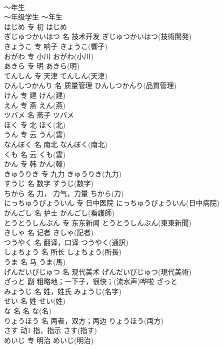 \documentclass[8pt]{extreport}
\begin{document}
\begin{CJK}{UTF8}{min}
\\	～年生	
\\	～年级学生	～年生	
\\	はじめ	专	初	はじめ	
\\	ぎじゅつかいはつ	名	技术开发	ぎじゅつかいはつ(技術開発)	
\\	きょうこ	专	响子	きょうこ(響子)	
\\	おがわ	专	小川	おがわ(小川)	
\\	あきら	专	明	あきら(明)	
\\	てんしん	专	天津	てんしん(天津)	
\\	ひんしつかんり	名	质量管理	ひんしつかんり(品質管理)	
\\	けん	专	建	けん(建)	
\\	えん	专	燕	えん(燕)	
\\	ツバメ	名	燕子	ツバメ	
\\	ほく	专	北	ほく(北)	
\\	うん	专	云	うん(雲)	
\\	なんぼく	名	南北	なんぼく(南北)	
\\	くも	名	云	くも(雲)	
\\	かん	专	韩	かん(韓)	
\\	きゅうりき	专	九力	きゅうりき(九力)	
\\	すうじ	名	数字	すうじ(数字)	
\\	ちから	名	力， 力气，力量	ちから(力)	
\\	にっちゅうびょういん	专	日中医院	にっちゅうびょういん(日中病院)	
\\	かんごし	名	护士	かんごし(看護師)	
\\	とうとうしんぶん	专	东东新闻	とうとうしんぶん(東東新聞)	
\\	きしゃ	名	记者	きしゃ(記者)	
\\	つうやく	名	翻译，口译	つうやく(通訳)	
\\	しょちょう	名	所长	しょちょう(所長)	
\\	うま	名	马	うま(馬)	
\\	げんだいびじゅつ	名	现代美术	げんだいびじゅつ(現代美術)	
\\	ざっと	副	粗略地；一下子，很快；(流水声)哗啦	ざっと	
\\	みょうじ	名	姓，姓氏	みょうじ(名字)	
\\	せい	名	姓	せい(姓)	
\\	な	名	名	な(名)	
\\	りょうほう	名	两者，双方；两边	りょうほう(両方)	
\\	さす	动1	指，指示	さす(指す)	
\\	めいじ	专	明治	めいじ(明治)	

\end{CJK}
\end{document}

